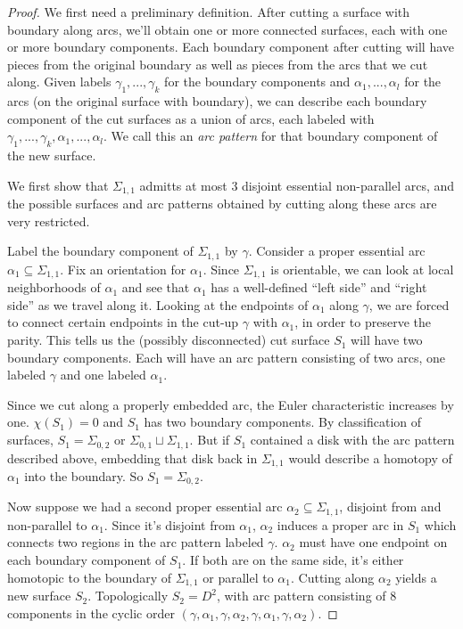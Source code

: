 \documentclass[12pt]{amsart}
\theoremstyle{definition}
\theoremstyle{remark}
\newcommand{\Si}{\Sigma}
\newcommand{\cin}{\subseteq}
\begin{document}
\begin{proof}

We first need a preliminary definition. After cutting a surface with boundary
along arcs, we'll obtain one or more connected surfaces, each with one or more
boundary components. Each boundary component after cutting will have pieces
from the original boundary as well as pieces from the arcs that we cut along.
Given labels $\gamma_1,...,\gamma_k$ for the boundary components and
$\alpha_1,...,\alpha_l$ for the arcs (on the original surface with boundary),
we can describe each boundary component of the cut surfaces as a union of arcs,
each labeled with $\gamma_1,...,\gamma_k,\alpha_1,...,\alpha_l$. We call this
an \emph{arc pattern} for that boundary component of the new surface.

We first show that $\Si_{1,1}$ admitts at most 3 disjoint essential
non-parallel arcs, and the possible surfaces and arc patterns obtained by
cutting along these arcs are very restricted.

Label the boundary component of $\Si_{1,1}$ by $\gamma$. Consider a proper
essential arc $\alpha_1 \cin \Si_{1,1}$. Fix an orientation for $\alpha_1$.
Since $\Si_{1,1}$ is orientable, we can look at local neighborhoods of
$\alpha_1$ and see that $\alpha_1$ has a well-defined ``left side'' and ``right
side'' as we travel along it. Looking at the endpoints of $\alpha_1$ along
$\gamma$, we are forced to connect certain endpoints in the cut-up $\gamma$
with $\alpha_1$, in order to preserve the parity. This tells us the (possibly
disconnected) cut surface $S_1$ will have two boundary components. Each will
have an arc pattern consisting of two arcs, one labeled $\gamma$ and one
labeled $\alpha_1$.

Since we cut along a properly embedded arc, the Euler characteristic increases
by one. $\chi(S_1)=0$ and $S_1$ has two boundary components. By classification
of surfaces, $S_1 = \Si_{0,2}$ or $\Si_{0,1} \sqcup \Si_{1,1}$. But if $S_1$
contained a disk with the arc pattern described above, embedding that disk back
in $\Si_{1,1}$ would describe a homotopy of $\alpha_1$ into the boundary. So
$S_1 = \Si_{0,2}$.

Now suppose we had a second proper essential arc $\alpha_2 \cin \Si_{1,1}$,
disjoint from and non-parallel to $\alpha_1$. Since it's disjoint from
$\alpha_1$, $\alpha_2$ induces a proper arc in $S_1$ which connects two regions
in the arc pattern labeled $\gamma$.  $\alpha_2$ must have one endpoint on each
boundary component of $S_1$. If both are on the same side, it's either
homotopic to the boundary of $\Si_{1,1}$ or parallel to $\alpha_1$. Cutting
along $\alpha_2$ yields a new surface $S_2$. Topologically $S_2=D^2$, with arc
pattern consisting of 8 components in the cyclic order
$(\gamma,\alpha_1,\gamma,\alpha_2,\gamma,\alpha_1,\gamma,\alpha_2)$.


\end{proof}
\end{document}
